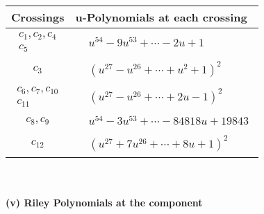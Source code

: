 \documentclass[1p]{elsarticle_modified}
\theoremstyle{definition}
\begin{document}
\begin{tabular}{m{50pt}|m{274pt}}
Crossings & \hspace{64pt}u-Polynomials at each crossing \\
\hline $$\begin{aligned}c_{1},c_{2},c_{4}\\c_{5}\end{aligned}$$&$\begin{aligned}
&u^{54}-9 u^{53}+\cdots-2 u+1
\end{aligned}$\\
\hline $$\begin{aligned}c_{3}\end{aligned}$$&$\begin{aligned}
&(u^{27}- u^{26}+\cdots+u^2+1)^{2}
\end{aligned}$\\
\hline $$\begin{aligned}c_{6},c_{7},c_{10}\\c_{11}\end{aligned}$$&$\begin{aligned}
&(u^{27}- u^{26}+\cdots+2 u-1)^{2}
\end{aligned}$\\
\hline $$\begin{aligned}c_{8},c_{9}\end{aligned}$$&$\begin{aligned}
&u^{54}-3 u^{53}+\cdots-84818 u+19843
\end{aligned}$\\
\hline $$\begin{aligned}c_{12}\end{aligned}$$&$\begin{aligned}
&(u^{27}+7 u^{26}+\cdots+8 u+1)^{2}
\end{aligned}$\\
\hline
\end{tabular}\\~\\
\newpage\renewcommand{\arraystretch}{1}
\flushleft \textbf{(v) Riley Polynomials at the component}\newline \\
\end{document}
